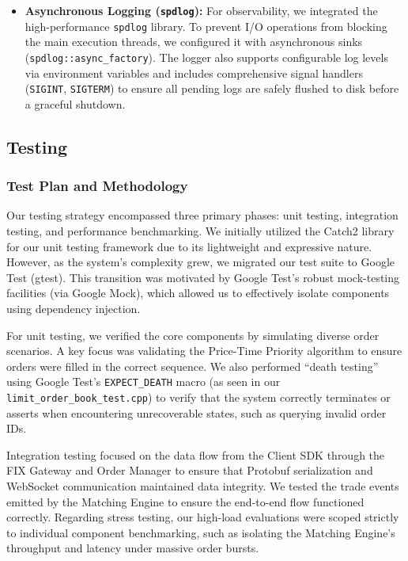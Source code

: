 \documentclass[12pt,a4paper]{article}
\begin{document}
\begin{itemize}
    \item \textbf{Asynchronous Logging (\texttt{spdlog}):} For observability, we integrated the high-performance \texttt{spdlog} library. To prevent I/O operations from blocking the main execution threads, we configured it with asynchronous sinks (\texttt{spdlog::async\_factory}). The logger also supports configurable log levels via environment variables and includes comprehensive signal handlers (\texttt{SIGINT}, \texttt{SIGTERM}) to ensure all pending logs are safely flushed to disk before a graceful shutdown.
\end{itemize}

\subsection{Testing}
\subsubsection{Test Plan and Methodology}
Our testing strategy encompassed three primary phases: unit testing, integration testing, and performance benchmarking. We initially utilized the Catch2 library for our unit testing framework due to its lightweight and expressive nature. However, as the system's complexity grew, we migrated our test suite to Google Test (gtest). This transition was motivated by Google Test's robust mock-testing facilities (via Google Mock), which allowed us to effectively isolate components using dependency injection.

For unit testing, we verified the core components by simulating diverse order scenarios. A key focus was validating the Price-Time Priority algorithm to ensure orders were filled in the correct sequence. We also performed ``death testing'' using Google Test's \texttt{EXPECT\_DEATH} macro (as seen in our \texttt{limit\_order\_book\_test.cpp}) to verify that the system correctly terminates or asserts when encountering unrecoverable states, such as querying invalid order IDs.

Integration testing focused on the data flow from the Client SDK through the FIX Gateway and Order Manager to ensure that Protobuf serialization and WebSocket communication maintained data integrity. We tested the trade events emitted by the Matching Engine to ensure the end-to-end flow functioned correctly. Regarding stress testing, our high-load evaluations were scoped strictly to individual component benchmarking, such as isolating the Matching Engine's throughput and latency under massive order bursts.
\end{document}
